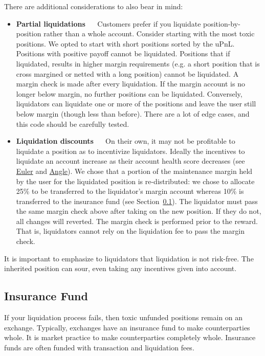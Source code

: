 \documentclass{article}
\begin{document}
\noindent There are additional considerations to also bear in mind:
\begin{itemize}
    \item \textbf{Partial liquidations} $\quad$ Customers prefer if you liquidate position-by-position rather than a whole account. Consider starting with the most toxic positions. We opted to start with short positions sorted by the uPnL. Positions with positive payoff cannot be liquidated. Positions that if liquidated, results in higher margin requirements (e.g. a short position that is cross margined or netted with a long position) cannot be liquidated. A margin check is made after every liquidation. If the margin account is no longer below margin, no further positions can be liquidated. Conversely, liquidators can liquidate one or more of the positions and leave the user still below margin (though less than before). There are a lot of edge cases, and this code should be carefully tested. 
    \item \textbf{Liquidation discounts} $\quad$ On their own, it may not be profitable to liquidate a position as to incentivize liquidators. Ideally the incentives to liquidate an account increase as their account health score decreases (see \href{https://docs.euler.finance/getting-started/white-paper#liquidations}{Euler} and \href{https://docs.angle.money/angle-borrowing-module/vaults/liquidations}{Angle}). We chose that a portion of the maintenance margin held by the user for the liquidated position is re-distributed: we chose to allocate 25\% to be transferred to the liquidator's margin account whereas 10\% is transferred to the insurance fund (see Section~\ref{sec:insurance}). The liquidator must pass the same margin check above after taking on the new position. If they do not, all changes will reverted. The margin check is performed prior to the reward. That is, liquidators cannot rely on the liquidation fee to pass the margin check.
\end{itemize}

\noindent It is important to emphasize to liquidators that liquidation is not risk-free. The inherited position can sour, even taking any incentives given into account. 

\subsection{Insurance Fund}
\label{sec:insurance}

\noindent If your liquidation process fails, then toxic unfunded positions remain on an exchange. Typically, exchanges have an insurance fund to make counterparties whole. It is market practice to make counterparties completely whole. Insurance funds are often funded with transaction and liquidation fees. \\
\end{document}
